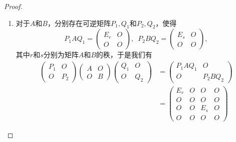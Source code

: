 \begin{enumerate}
          \begin{proof}
              \begin{enumerate}
                  \item 对于$A$和$B$，分别存在可逆矩阵$P_1,Q_1$和$P_2,Q_2$，使得
                        \[P_1AQ_1=\begin{pmatrix}
                                E_r & O \\
                                O   & O
                            \end{pmatrix},\enspace P_2BQ_2=\begin{pmatrix}
                                E_s & O \\
                                O   & O
                            \end{pmatrix},\]
                        其中$r$和$s$分别为矩阵$A$和$B$的秩，于是我们有
                        \begin{align*}
                            \begin{pmatrix}
                                P_1 & O   \\
                                O   & P_2
                            \end{pmatrix}
                            \begin{pmatrix}
                                A & O \\
                                O & B
                            \end{pmatrix}
                            \begin{pmatrix}
                                Q_1 & O   \\
                                O   & Q_2
                            \end{pmatrix}
                             & =\begin{pmatrix}
                                    P_1AQ_1 & O \\ O & P_2BQ_2
                                \end{pmatrix}    \\
                             & =\begin{pmatrix}
                                    E_r & O & O   & O \\
                                    O   & O & O   & O \\
                                    O   & O & E_s & O \\
                                    O   & O & O   & O

\end{pmatrix}
\end{align*}
\end{enumerate}
\end{proof}
\end{enumerate}
